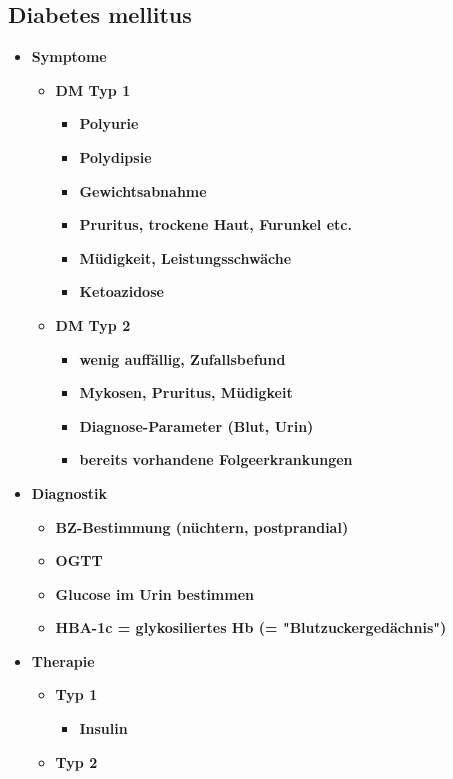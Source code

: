 	\subsection{Diabetes mellitus}
	\begin{itemize}
		\item \textbf{Symptome}
			\begin{itemize}
				\item \textbf{DM Typ 1}
					\begin{itemize}
						\item \textbf{Polyurie}
						\item \textbf{Polydipsie}
						\item \textbf{Gewichtsabnahme}
						\item \textbf{Pruritus, trockene Haut, Furunkel etc.}
						\item \textbf{Müdigkeit, Leistungsschwäche}
						\item \textbf{Ketoazidose}
					\end{itemize}		
				\item \textbf{DM Typ 2}
					\begin{itemize}
						\item \textbf{wenig auffällig, Zufallsbefund}
						\item \textbf{Mykosen, Pruritus, Müdigkeit}
						\item \textbf{Diagnose-Parameter (Blut, Urin)}
						\item \textbf{bereits vorhandene Folgeerkrankungen}
					\end{itemize}
			\end{itemize}
		\item \textbf{Diagnostik}
			\begin{itemize}
				\item \textbf{BZ-Bestimmung (nüchtern, postprandial)}
				\item \textbf{OGTT}
				\item \textbf{Glucose im Urin bestimmen}
				\item \textbf{HBA-1c = glykosiliertes Hb (= "Blutzuckergedächnis")}
			\end{itemize}
		\item \textbf{Therapie}
			\begin{itemize}
				\item \textbf{Typ 1}
					\begin{itemize}
						\item \textbf{Insulin}
					\end{itemize}
				\item \textbf{Typ 2}

\end{itemize}
\end{itemize}
